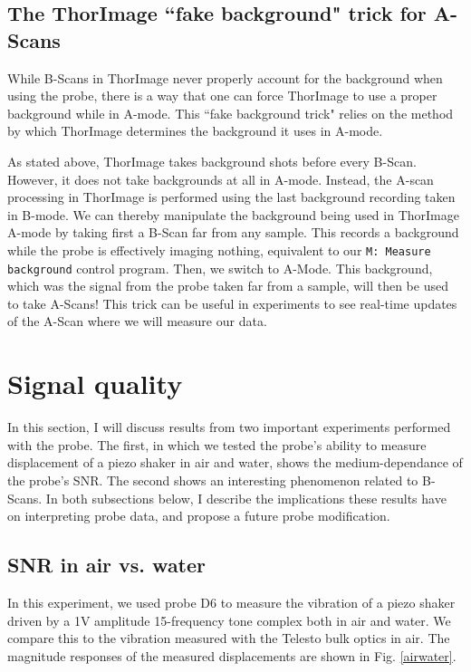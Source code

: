 \documentclass{article}
\begin{document}
\subsection{The ThorImage ``fake background" trick for A-Scans}

\par{While B-Scans in ThorImage never properly account for the background when using the probe, there is a way that one can force ThorImage to use a proper background while in A-mode. This ``fake background trick" relies on the method by which ThorImage determines the background it uses in A-mode.}

\par{As stated above, ThorImage takes background shots before every B-Scan. However, it does not take backgrounds at all in A-mode. Instead, the A-scan processing in ThorImage is performed using the last background recording taken in B-mode. We can thereby manipulate the background being used in ThorImage A-mode by taking first a B-Scan far from any sample. This records a background while the probe is effectively imaging nothing, equivalent to our \texttt{M: Measure background} control program. Then, we switch to A-Mode. This background, which was the signal from the probe taken far from a sample, will then be used to take A-Scans! This trick can be useful in experiments to see real-time updates of the A-Scan where we will measure our data.}

\section{Signal quality}

\par{In this section, I will discuss results from two important experiments performed with the probe. The first, in which we tested the probe's ability to measure displacement of a piezo shaker in air and water, shows the medium-dependance of the probe's SNR. The second shows an interesting phenomenon related to B-Scans. In both subsections below, I describe the implications these results have on interpreting probe data, and propose a future probe modification.}

\subsection{SNR in air vs. water}\label{SNRsection}
\hypertarget{SNRsection}{}

\par{In this experiment, we used probe D6 to measure the vibration of a piezo shaker driven by a 1V amplitude 15-frequency tone complex both in air and water. We compare this to the vibration measured with the Telesto bulk optics in air. The magnitude responses of the measured displacements are shown in Fig. \ref{airwater}.}
\end{document}
